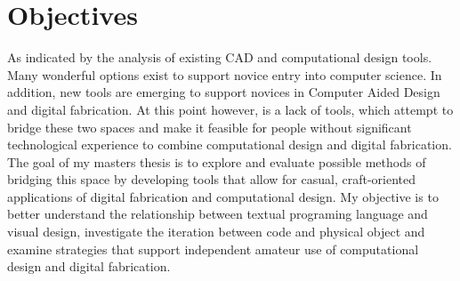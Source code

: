\chapter{Objectives}
As indicated by the analysis of existing CAD and computational design tools. Many wonderful options exist to support novice entry into computer science. In addition, new tools are emerging to support novices in Computer Aided Design and digital fabrication. At this point however, is a lack of tools, which attempt to bridge these two spaces and make it feasible for people without significant technological experience to combine computational design and digital fabrication. The goal of my masters thesis is to explore and evaluate possible methods of bridging this space by developing tools that allow for casual, craft-oriented applications of digital fabrication and computational design. My objective is to better understand the relationship between textual programing language and visual design, investigate the iteration between code and physical object and examine strategies that support independent amateur use of computational design and digital fabrication. 

